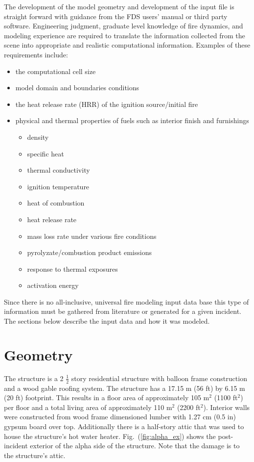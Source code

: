 \documentclass[11pt,oneside]{book}
\begin{document}
The development of the model geometry and development of the input file is straight forward with guidance from the FDS users' manual \cite{FDS_Users_Guide} or third party software.  Engineering judgment, graduate level knowledge of fire dynamics, and modeling experience are required to  translate the information collected from the scene into appropriate and realistic computational information.  Examples of these requirements include:
\begin{itemize}
\item the computational cell size
\item model domain and boundaries conditions
\item the heat release rate (HRR) of the ignition source/initial fire
\item physical and thermal properties of fuels such as interior finish and furnishings
	\begin{itemize}
	\item density
	\item specific heat
	\item thermal conductivity
	\item ignition temperature
	\item heat of combustion
	\item heat release rate
	\item mass loss rate under various fire conditions
	\item pyrolyzate/combustion product emissions
	\item response to thermal exposures
	\item activation energy
	\end{itemize}
\end{itemize}
Since there is no all-inclusive, universal fire modeling input data base this type of information must be gathered from literature or generated for a given incident.  The sections below describe the input data and how it was modeled. 


\section{Geometry}
\label{geom}
The structure is a 2 $\tfrac{1}{2}$ story residential structure with balloon frame construction and a wood gable roofing system.  The structure has a 17.15 m (56 ft) by 6.15 m (20 ft) footprint. This results in a floor area of approximately 105 m$^2$ (1100 ft$^2$) per floor and a total living area of approximately 110 m$^2$ (2200 ft$^2$). Interior walls were constructed from wood frame dimensioned lumber with 1.27 cm (0.5 in) gypsum board over top. Additionally there is a half-story attic that was used to house the structure's hot water heater. Fig.~(\ref{fig:alpha_ex}) shows the post-incident exterior of the alpha side of the structure. Note that the damage is to the structure's attic.
\end{document}
